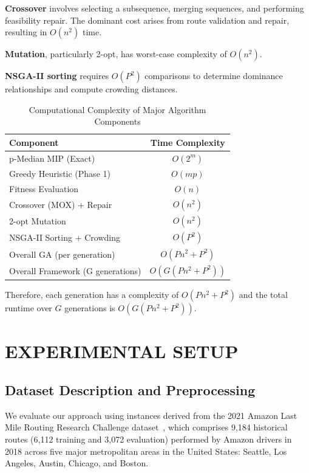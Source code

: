 \documentclass[conference]{IEEEtran}
\begin{document}
\textbf{Crossover} involves selecting a subsequence, merging sequences, and performing feasibility repair. The dominant cost arises from route validation and repair, resulting in $O(n^2)$ time.

\textbf{Mutation}, particularly 2-opt, has worst-case complexity of $O(n^2)$.

\textbf{NSGA-II sorting} requires $O(P^2)$ comparisons to determine dominance relationships and compute crowding distances.

\begin{table}[htbp]
\centering
\caption{Computational Complexity of Major Algorithm Components}
\label{tab:complexity-summary}
\renewcommand{\arraystretch}{1.2}
\begin{tabular}{|l|c|}
\hline
\textbf{Component} & \textbf{Time Complexity} \\
\hline
p-Median MIP (Exact) & $O(2^m)$ \\
\hline
Greedy Heuristic (Phase 1) & $O(mp)$ \\
\hline
Fitness Evaluation & $O(n)$ \\
\hline
Crossover (MOX) + Repair & $O(n^2)$ \\
\hline
2-opt Mutation & $O(n^2)$ \\
\hline
NSGA-II Sorting + Crowding & $O(P^2)$ \\
\hline
Overall GA (per generation) & $O(Pn^2 + P^2)$ \\
\hline
Overall Framework (G generations) & $O(G(Pn^2 + P^2))$ \\
\hline
\end{tabular}
\end{table}

Therefore, each generation has a complexity of $O(Pn^2 + P^2)$ and the total runtime over $G$ generations is $O(G(Pn^2 + P^2))$.

\section{EXPERIMENTAL SETUP}

\subsection{Dataset Description and Preprocessing}

We evaluate our approach using instances derived from the 2021 Amazon Last Mile Routing Research Challenge dataset~\cite{b8}, which comprises 9,184 historical routes (6,112 training and 3,072 evaluation) performed by Amazon drivers in 2018 across five major metropolitan areas in the United States: Seattle, Los Angeles, Austin, Chicago, and Boston.
\end{document}
